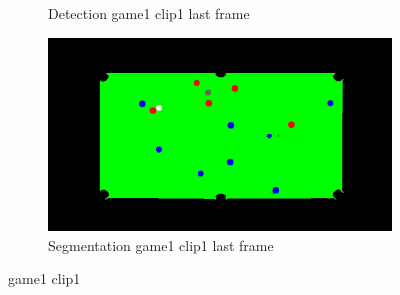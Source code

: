 \begin{figure}[H]
\begin{subfigure}[b]{0.35\textwidth}
        \caption{Detection game1 clip1 last frame}
        \label{fig: game1_clip1_last_frame_detected}
    \end{subfigure}
    \begin{subfigure}[b]{0.35\textwidth}
        \centering
        \includegraphics[width=\textwidth]{images/Segmentation/game1_clip1_segmented_balls_last_frame.jpg}
        \caption{Segmentation game1 clip1 last frame}
		\label{fig: game1_clip1_last_frame_segmented}
    \end{subfigure}
    
	\caption{game1 clip1}
\end{figure}

